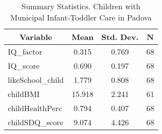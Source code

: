 
\begin{table}[htbp]\centering \caption{Summary Statistics. Children with Municipal Infant-Toddler Care in Padova \label{bothChildasiloMuniPadova}}
\begin{tabular}{l c c  c}\hline\hline
\multicolumn{1}{c}{\textbf{Variable}} & \textbf{Mean}
 & \textbf{Std. Dev.} & \textbf{N}\\ \hline
IQ\_factor & 0.315 & 0.769  & 68\\
IQ\_score & 0.690 & 0.197  & 68\\
likeSchool\_child & 1.779 & 0.808  & 68\\
childBMI & 15.918 & 2.241  & 61\\
childHealthPerc & 0.794 & 0.407  & 68\\
childSDQ\_score & 9.074 & 4.426  & 68\\
\hline\end{tabular}
\end{table}
